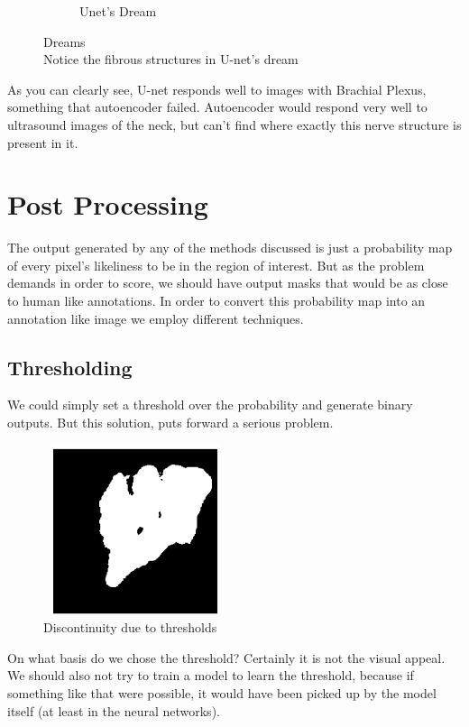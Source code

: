 \documentclass[12pt, a4paper]{article}
\begin{document}
\begin{figure}[h]
\begin{subfigure}{0.5\textwidth}
\caption{Unet's Dream}
\label{fig:unetsdream}
\end{subfigure}
\caption{Dreams\\Notice the fibrous structures in U-net's dream}
\label{fig:dreams}
\end{figure}

As you can clearly see, U-net responds well to images with Brachial Plexus, something that autoencoder failed. Autoencoder would respond very well to ultrasound images of the neck, but can't find where exactly this nerve structure is present in it.
\section{Post Processing}
The output generated by any of the methods discussed is just a probability map of every pixel's likeliness to be in the region of interest. But as the problem demands in order to score, we should have output masks that would be as close to human like annotations. In order to convert this probability map into an annotation like image we employ different techniques.

\subsection{Thresholding}
We could simply set a threshold over the probability and generate binary outputs. But this solution, puts forward a serious problem.
\\
\begin{figure}
\centering
\includegraphics[width=0.48\textwidth, height=5cm]{holes.png} 
\caption{Discontinuity due to thresholds}
\label{fig:holeinthewall}
\end{figure}
On what basis do we chose the threshold? Certainly it is not the visual appeal. We should also not try to train a model to learn the threshold, because if something like that were possible, 
it would have been picked up by the model itself (at least in the neural networks).
\end{document}
